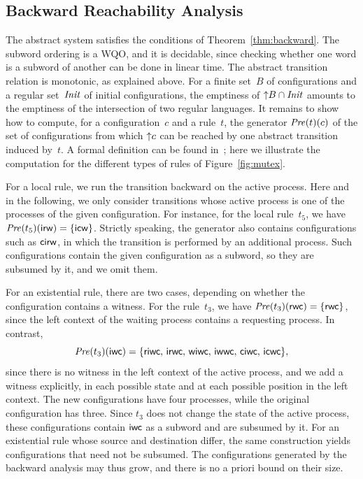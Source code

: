 \subsection{Backward Reachability Analysis}

The abstract system satisfies the conditions of Theorem~\ref{thm:backward}. The
subword ordering is a WQO, and it is decidable, since checking whether one
word is a subword of another can be done in linear time. The abstract transition relation is
monotonic, as explained above. For a finite set~$B$ of configurations and a
regular set~$\mathit{Init}$ of initial configurations, the emptiness of ${\uparrow}B \cap
\mathit{Init}$ amounts to the emptiness of the intersection of two regular languages.
It remains to show how to compute, for a configuration~$c$ and a rule~$t$, the
generator $\mathit{Pre}(t)(c)$ of the set of configurations from which ${\uparrow}c$ can be
reached by one abstract transition induced by~$t$. A formal definition can be
found in~\cite{ADHR07}; here we illustrate the computation for the different
types of rules of Figure~\ref{fig:mutex}.

For a local rule, we run the transition backward on the active process. Here
and in the following, we only consider transitions whose active process is one
of the processes of the given configuration. For instance, for the local
rule~$t_5$, we have $\mathit{Pre}(t_5)(\mathsf{i}\mathsf{r}\mathsf{w}) = \{\mathsf{i}\mathsf{c}\mathsf{w}\}$.
Strictly speaking, the generator also contains configurations such as
$\mathsf{c}\mathsf{i}\mathsf{r}\mathsf{w}$, in which the transition is performed by an additional
process. Such configurations contain the given configuration as a subword, so
they are subsumed by it, and we omit them.

For an existential rule, there are two cases, depending on whether the
configuration contains a witness. For the rule~$t_3$, we have
$\mathit{Pre}(t_3)(\mathsf{r}\mathsf{w}\mathsf{c}) = \{\mathsf{r}\mathsf{w}\mathsf{c}\}$, since the left context of the
waiting process contains a requesting process. In contrast,
\[
\mathit{Pre}(t_3)(\mathsf{i}\mathsf{w}\mathsf{c}) = \{
\mathsf{r}\mathsf{i}\mathsf{w}\mathsf{c},\, \mathsf{i}\mathsf{r}\mathsf{w}\mathsf{c},\,
\mathsf{w}\mathsf{i}\mathsf{w}\mathsf{c},\, \mathsf{i}\mathsf{w}\mathsf{w}\mathsf{c},\,
\mathsf{c}\mathsf{i}\mathsf{w}\mathsf{c},\, \mathsf{i}\mathsf{c}\mathsf{w}\mathsf{c} \},
\]
since there is no witness in the left context of the active process, and we
add a witness explicitly, in each possible state and at each possible
position in the left context. The new configurations have four processes,
while the original configuration has three. Since $t_3$ does not change the
state of the active process, these configurations contain $\mathsf{i}\mathsf{w}\mathsf{c}$ as
a subword and are subsumed by it. For an existential rule whose source and
destination differ, the same construction yields configurations that need not
be subsumed. The configurations generated by the backward analysis may thus
grow, and there is no a priori bound on their size.

